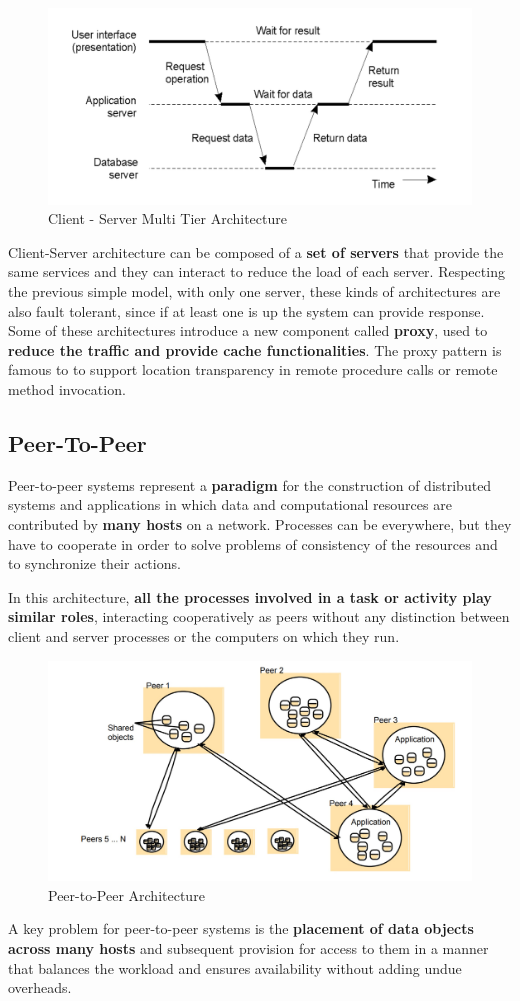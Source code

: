 \begin{figure}[!ht]
            \centering
            \includegraphics[width=.7\linewidth]{images/modelOfSystems/MultiTierArchitecture.jpeg}
            \caption{Client - Server Multi Tier Architecture}
    \end{figure}
Client-Server architecture can be composed of a \textbf{set of servers} that provide the same services and they can interact to reduce the load of each server. Respecting the previous simple model, with only one server, these kinds of architectures are also fault tolerant, since if at least one is up the system can provide response.
Some of these architectures introduce a new component called \textbf{proxy}, used to \textbf{reduce the traffic and provide cache functionalities}. The proxy pattern is famous to to support location transparency in remote procedure calls or remote method invocation.

\subsection{Peer-To-Peer}
Peer-to-peer systems represent a \textbf{paradigm} for the construction of distributed systems and applications in which data and computational resources are contributed by \textbf{many hosts} on a network. Processes can be everywhere, but they have to cooperate in order to solve problems of consistency of the resources and to synchronize their actions. 

In this architecture, \textbf{all the processes involved in a task or activity play similar roles}, interacting cooperatively as peers without any distinction between client and server processes or the computers on which they run.
\newpage
\begin{figure}[!h]
            \centering
            \includegraphics[width=.7\linewidth]{images/modelOfSystems/Peer-to-PeerArchitecture.jpeg}
            \caption{Peer-to-Peer Architecture}
    \end{figure}
A key problem for peer-to-peer systems is the \textbf{placement of data objects across many hosts} and subsequent provision for access to them in a manner that balances the workload and ensures availability without adding undue overheads.

